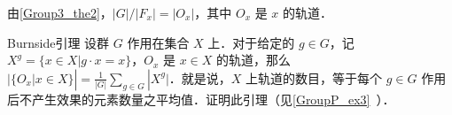 \begin{corollary}{}\label{Group3_cor1}
由\autoref{Group3_the2}，$|G|/|F_x|=|O_x|$，其中 $O_x$ 是 $x$ 的轨道．
\end{corollary}

\begin{exercise}{Burnside引理}\label{Group3_exe2}
设群 $G$ 作用在集合 $X$ 上．对于给定的 $g\in G$，记 $X^g=\{x\in X|g\cdot x=x\}$，$O_x$ 是 $x\in X$ 的轨道，那么 $|\{O_x|x\in X\}|=\frac{1}{|G|}\sum_{g\in G}|X^g|$．就是说，$X$ 上轨道的数目，等于每个 $g\in G$ 作用后不产生效果的元素数量之平均值．证明此引理（见\autoref{GroupP_ex3}~）．
\end{exercise}
